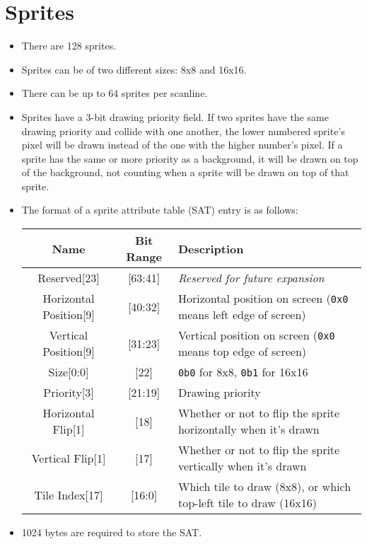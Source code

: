 \documentclass{article}
\begin{document}
\section{Sprites}
	\begin{itemize}
	\item There are 128 sprites.

	\item Sprites can be of two different sizes:  8x8 and 16x16.

	\item There can be up to 64 sprites per scanline.

	\item Sprites have a 3-bit drawing priority field.  If two sprites have
	the same drawing priority and collide with one another, the lower
	numbered sprite's pixel will be drawn instead of the one with the higher
	number's pixel.  If a sprite has the same or more priority as a
	background, it will be drawn on top of the background, not counting
	when a sprite will be drawn on top of that sprite.

	\item The format of a sprite attribute table (SAT) entry is as follows:
		\begin{table}[H]
			\begin{center}
				\begin{tabular}{|c|c|p{65mm}|}
					\hline
					\textbf{Name} & \textbf{Bit Range} 
						& \textbf{Description}\\
					\hline
					Reserved[23] & [63:41]
						& \textit{Reserved for future expansion}\\
					Horizontal Position[9] & [40:32]
						& Horizontal position on screen (\texttt{0x0} means
						left edge of screen)\\
					Vertical Position[9] & [31:23]
						& Vertical position on screen (\texttt{0x0} means
						top edge of screen)\\
					Size[0:0] & [22]
						& \texttt{0b0} for 8x8, \texttt{0b1} for 16x16 \\
					Priority[3] & [21:19]
						& Drawing priority\\
					Horizontal Flip[1] & [18]
						& Whether or not to flip the sprite horizontally
						when it's drawn\\
					Vertical Flip[1] & [17]
						& Whether or not to flip the sprite vertically
						when it's drawn\\
					Tile Index[17] & [16:0]
						& Which tile to draw (8x8), or which top-left tile
						to draw (16x16) \\
					\hline
				\end{tabular}
			\end{center}
		\end{table}

	\item 1024 bytes are required to store the SAT.
	\end{itemize}
	\newpage
\end{document}
